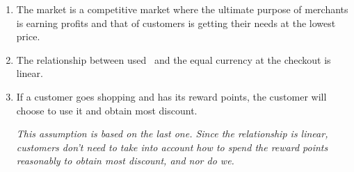 \begin{enumerate}
	\item
	The market is a competitive market where the ultimate purpose of merchants is earning profits and that of customers is getting their needs at the lowest price.

	\item
	The relationship between used \RPd\ and the equal currency at the checkout is linear.
	
	\item
	If a customer goes shopping and has its reward points, the customer will choose to use it and obtain most discount.
	
	\textsl{
	This assumption is based on the last one. Since the relationship is linear, customers don't need to take into account how to spend the reward points reasonably to obtain most discount, and nor do we.
	}
	
\end{enumerate}